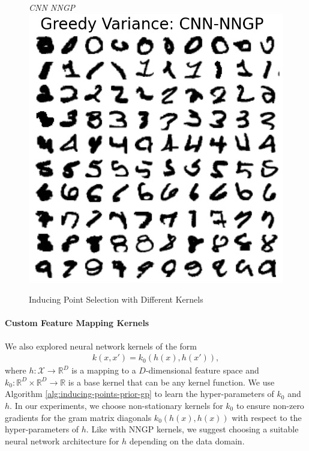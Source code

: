 \documentclass{article}
\numberwithin{equation}{section}
\begin{document}
\begin{figure}[h!]
\begin{minipage}{.25\textwidth}
\end{minipage}%
\begin{minipage}{.25\textwidth}
  \centering
  \textit{CNN NNGP}
  \includegraphics[width=\linewidth, trim={0 0 0 1.5cm},clip]{thesis-report/figures/mnist_inducing_point/greedy_mnist_cnn_nngp_inducing_point_selection.png}
\end{minipage}%
\caption{Inducing Point Selection with Different Kernels}\label{fig:mnist-inducing-points}
\end{figure}


\paragraph{Custom Feature Mapping Kernels} We also explored neural network kernels of the form
\begin{align}
    k(x, x') = k_0(h(x), h(x')),
    \label{custom-feature-map-kernel}
\end{align}
where $h: \mathcal{X} \rightarrow \mathbb{R}^D$ is a mapping to a $D$-dimensional feature space and $k_0: \mathbb{R}^D \times \mathbb{R}^D \rightarrow \mathbb{R}$ is a base kernel that can be any kernel function. 
We use Algorithm \ref{alg:inducing-points-prior-gp} to learn the hyper-parameters of $k_0$ and $h$. 
In our experiments, we choose non-stationary kernels for $k_0$ to ensure non-zero gradients for the gram matrix diagonals $k_0(h(x), h(x))$ with respect to the hyper-parameters of $h$. 
Like with NNGP kernels, we suggest choosing a suitable neural network architecture for $h$ depending on the data domain.
\end{document}
